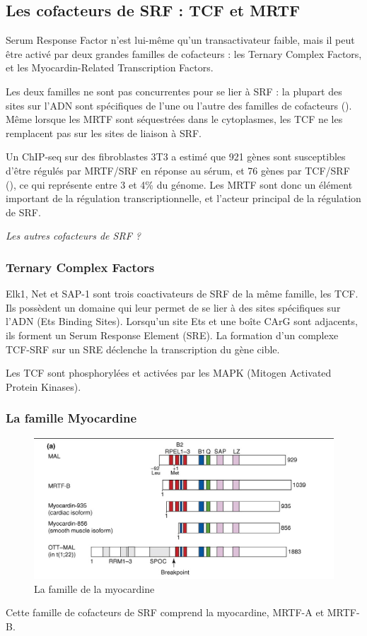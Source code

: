 \documentclass{report}
\begin{document}
\subsection{Les cofacteurs de SRF : TCF et MRTF}

Serum Response Factor n'est lui-même qu'un transactivateur faible, mais il peut être activé par deux grandes familles de cofacteurs : les Ternary Complex Factors, et les Myocardin-Related Transcription Factors. 

Les deux familles ne sont pas concurrentes pour se lier à SRF : la plupart des sites sur l'ADN sont spécifiques de l'une ou l'autre des familles de cofacteurs (\cite{esnault_rho-actin_2014}). Même lorsque les MRTF sont séquestrées dans le cytoplasmes, les TCF ne les remplacent pas sur les sites de liaison à SRF. 

Un ChIP-seq sur des fibroblastes 3T3 a estimé que 921 gènes sont susceptibles d'être régulés par MRTF/SRF en réponse au sérum, et 76 gènes par TCF/SRF (\cite{esnault_rho-actin_2014}), ce qui représente entre 3 et 4\% du génome. Les MRTF sont donc un élément important de la régulation transcriptionnelle, et l'acteur principal de la régulation de SRF. 

\emph{Les autres cofacteurs de SRF ? }

\subsubsection{Ternary Complex Factors}

Elk1, Net et SAP-1 sont trois coactivateurs de SRF de la même famille, les TCF. Ils possèdent un domaine qui leur permet de se lier à des sites spécifiques sur l'ADN (Ets Binding Sites). 
Lorsqu'un site Ets et une boîte CArG sont adjacents, ils forment un Serum Response Element (SRE). La formation d'un complexe TCF-SRF sur un SRE déclenche la transcription du gène cible. 

Les TCF sont phosphorylées et activées par les MAPK (Mitogen Activated Protein Kinases). 


\subsubsection{La famille Myocardine}

\begin{figure}[h!]
\includegraphics[scale=0.5]{MRTF_famille.png}
\caption{La famille de la myocardine \cite{posern_actin_2006}}
\end{figure}
Cette famille de cofacteurs de SRF comprend la myocardine, MRTF-A et MRTF-B.
\end{document}
